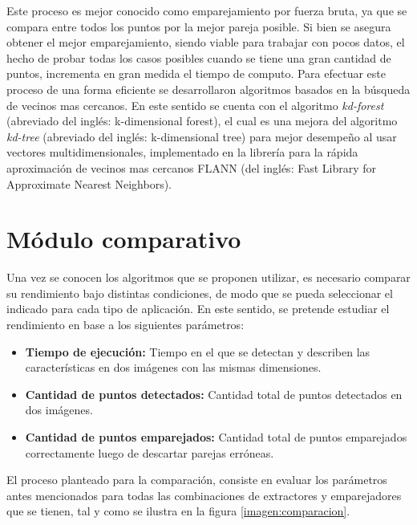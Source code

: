 Este proceso es mejor conocido como emparejamiento por fuerza bruta, ya que se compara entre todos los puntos por la mejor pareja posible. Si bien se asegura obtener el mejor emparejamiento, siendo viable para trabajar con pocos datos, el hecho de probar todas los casos posibles cuando se tiene una gran cantidad de puntos, incrementa en gran medida el tiempo de computo. Para efectuar este proceso de una forma eficiente se desarrollaron algoritmos basados en la búsqueda de vecinos mas cercanos. En este sentido se cuenta con el algoritmo \textit{kd-forest} (abreviado del inglés: k-dimensional forest), el cual es una mejora del algoritmo \textit{kd-tree} (abreviado del inglés: k-dimensional tree) para mejor desempeño al usar vectores multidimensionales, implementado en la librería para la rápida aproximación de vecinos mas cercanos FLANN \cite{flann} (del inglés: Fast Library for Approximate Nearest Neighbors).


\section{Módulo comparativo}

Una vez se conocen los algoritmos que se proponen utilizar, es necesario comparar su rendimiento bajo distintas condiciones, de modo que se pueda seleccionar el indicado para cada tipo de aplicación. En este sentido, se pretende estudiar el rendimiento en base a los siguientes parámetros:


\begin{itemize}
	\item \textbf{Tiempo de ejecución:} Tiempo en el que se detectan y describen las características en dos imágenes con las mismas dimensiones.
	
	\item \textbf{Cantidad de puntos detectados:} Cantidad total de puntos detectados en dos imágenes.
	
	\item \textbf{Cantidad de puntos emparejados:} Cantidad total de puntos emparejados correctamente luego de descartar parejas erróneas. 
\end{itemize}

El proceso planteado para la comparación, consiste en evaluar los parámetros antes mencionados para todas las combinaciones de extractores y emparejadores que se tienen, tal y como se ilustra en la figura \ref{imagen:comparacion}.

